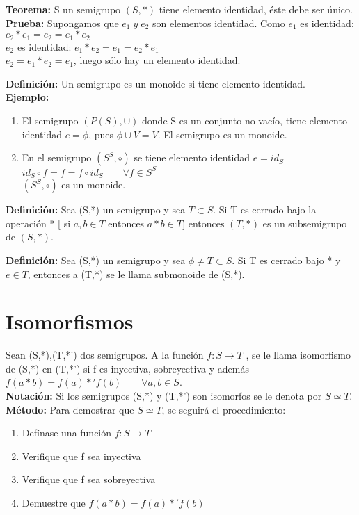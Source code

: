 \textbf{Teorema: }S un semigrupo $(S,*)$ tiene elemento identidad, éste debe ser único.\\
\textbf{Prueba: } Supongamos que $e_1\; y\; e_2$ son elementos identidad. Como $e_1$ es identidad: $e_2 * e_1 = e_2 = e_1*e_2$\\
$e_2$ es identidad: $e_1*e_2=e_1=e_2*e_1$\\
$e_2=e_1*e_2=e_1$, luego sólo hay un elemento identidad.

\textbf{Definición: } Un semigrupo es un monoide si tiene elemento identidad.\\
\textbf{Ejemplo: }
\begin{enumerate}
\item El semigrupo $(P(S),\cup)$ donde S es un conjunto no vacío, tiene elemento identidad $e=\phi$, pues $\phi \cup V=V$. El semigrupo es un monoide.
\item En el semigrupo $(S^S,\circ)$ se tiene elemento identidad $e=id_S$\\
		$id_S \circ f = f=f\circ id_S \quad\quad \forall f\in S^S$\\
		$(S^S,\circ)$ es un monoide.
\end{enumerate}

\textbf{Definición: }Sea (S,*) un semigrupo y sea $T\subset S$. Si T es cerrado bajo la operación * [ si $a,b\in T$ entonces $a*b\in T$] entonces $(T,*)$ es un subsemigrupo de $(S,*)$.

\textbf{Definición: }Sea (S,*) un semigrupo y sea $\phi\not= T\subset S$. Si T es cerrado bajo * y $e\in T$, entonces a (T,*) se le llama submonoide de (S,*).

\section{Isomorfismos}

Sean (S,*),(T,*') dos semigrupos. A la función $f:S\rightarrow T$ , se le llama isomorfismo de (S,*) en (T,*') si f es inyectiva, sobreyectiva y además  $f(a*b)=f(a)*' f(b) \quad\quad \forall a,b\in S$.\\
\textbf{Notación: }Si los semigrupos (S,*) y (T,*') son isomorfos se le denota por $S\simeq T$.\\

\textbf{Método: }Para demostrar que $S\simeq T$, se seguirá el procedimiento:
\begin{enumerate}
\item Defínase una función $f:S\rightarrow T$
\item Verifique que f sea inyectiva
\item Verifique que f sea sobreyectiva
\item Demuestre que $f(a*b)=f(a)*' f(b)$
\end{enumerate}

